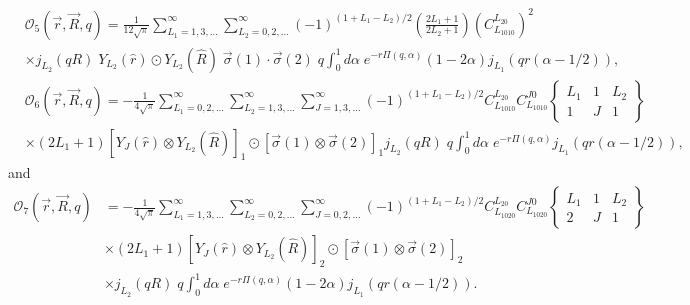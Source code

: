 \documentclass[12pt,letterpaper]{book}
\begin{document}
\begin{equation}
\begin{split}
&\mathcal{O}_5(\vec{r},\vec{R},q)=\frac{1}{12\sqrt{\pi}}\sum_{L_1=1,3,...}^{\infty}\sum_{L_2=0,2,...}^{\infty}(-1)^{(1+L_1-L_2)/2}\left(\frac{2L_1+1}{2L_2+1}\right)\left(C_{L_1010}^{L_20}\right)^2\\
&\times j_{L_2}(q R)\;Y_{L_2}(\hat{r})\odot Y_{L_2}(\hat{R})\;\vec{\sigma}(1)\cdot\vec{\sigma}(2)\;q\int_0^1 d\alpha\;e^{-r\Pi(q,\alpha)}(1-2\alpha)j_{L_1}(q r(\alpha-1/2)),
\end{split}
\end{equation}
\begin{equation}
\begin{split}
&\mathcal{O}_6(\vec{r},\vec{R},q)=-\frac{1}{4\sqrt{\pi}}\sum_{L_1=0,2,...}^{\infty}\sum_{L_2=1,3,...}^{\infty}\sum_{J=1,3,...}^{\infty}(-1)^{(1+L_1-L_2)/2}C_{L_1010}^{L_20}C_{L_1010}^{J0}\left\{\begin{array}{ccc}
L_1 & 1 & L_2\\
1 & J & 1
\end{array}\right\}\\
&\times(2L_1+1)\left[Y_J(\hat{r})\otimes Y_{L_2}(\hat{R})\right]_1\odot\left[\vec{\sigma}(1)\otimes\vec{\sigma}(2)\right]_1 j_{L_2}(q R)\;q\int_0^1d\alpha\;e^{-r\Pi(q,\alpha)}j_{L_1}(qr(\alpha-1/2)),
\end{split}
\end{equation}
and
\begin{equation}
\begin{split}
\mathcal{O}_7(\vec{r},\vec{R},q)&=-\frac{1}{4\sqrt{\pi}}\sum_{L_1=1,3,...}^{\infty}\sum_{L_2=0,2,...}^{\infty}\sum_{J=0,2,...}^{\infty}(-1)^{(1+L_1-L_2)/2}C_{L_1020}^{L_20}C_{L_1020}^{J0}\left\{\begin{array}{ccc}
L_1 & 1 & L_2\\
2 & J & 1
\end{array}\right\}\\
&\times(2L_1+1)\left[Y_J(\hat{r})\otimes Y_{L_2}(\hat{R})\right]_2\odot\left[\vec{\sigma}(1)\otimes\vec{\sigma}(2)\right]_2 \\
&\times j_{L_2}(q R)\;q \int_0^1d\alpha\;e^{-r\Pi(q,\alpha)}(1-2\alpha)j_{L_1}(qr(\alpha-1/2)).
\end{split}
\end{equation}
\end{document}
